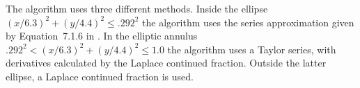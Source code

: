 \documentclass[twoside]{MATH77}
\begin{document}
The algorithm uses three different methods. Inside the ellipse $%
(x/6.3)^2+(y/4.4)^2\leq .292^2$ the algorithm uses the series approximation
given by Equation~7.1.6 in \cite{ams55}. In the elliptic annulus $%
.292^2<(x/6.3)^2+(y/4.4)^2\leq 1.0$ the algorithm uses a Taylor series, with
derivatives calculated by the Laplace continued fraction. Outside the latter
ellipse, a Laplace continued fraction is used.
% 
% 
% 
\end{document}
